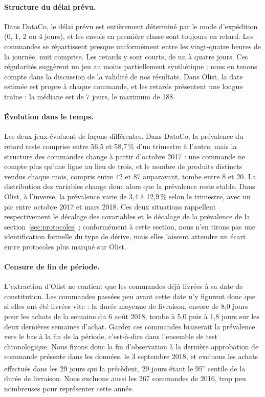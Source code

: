 \documentclass[11pt,a4paper]{article}
\theoremstyle{definition}
\begin{document}
\paragraph{Structure du délai prévu.} Dans DataCo, le délai prévu est entièrement déterminé par le mode d'expédition (0, 1, 2 ou 4 jours), et les envois en première classe sont toujours en retard. Les commandes se répartissent presque uniformément entre les vingt-quatre heures de la journée, nuit comprise. Les retards y sont courts, de un à quatre jours. Ces régularités suggèrent un jeu au moins partiellement synthétique ; nous en tenons compte dans la discussion de la validité de nos résultats. Dans Olist, la date estimée est propre à chaque commande, et les retards présentent une longue traîne : la médiane est de 7 jours, le maximum de 188.

\paragraph{Évolution dans le temps.} Les deux jeux évoluent de façons différentes. Dans DataCo, la prévalence du retard reste comprise entre 56,5 et 58,7\,\% d'un trimestre à l'autre, mais la structure des commandes change à partir d'octobre 2017 : une commande ne compte plus qu'une ligne au lieu de trois, et le nombre de produits distincts vendus chaque mois, compris entre 42 et 87 auparavant, tombe entre 8 et 20. La distribution des variables change donc alors que la prévalence reste stable. Dans Olist, à l'inverse, la prévalence varie de 3,4 à 12,9\,\% selon le trimestre, avec un pic entre octobre 2017 et mars 2018. Ces deux situations rappellent respectivement le décalage des covariables et le décalage de la prévalence de la section~\ref{sec:protocoles} ; conformément à cette section, nous n'en tirons pas une identification formelle du type de dérive, mais elles laissent attendre un écart entre protocoles plus marqué sur Olist.

\paragraph{Censure de fin de période.} L'extraction d'Olist ne contient que les commandes déjà livrées à sa date de constitution. Les commandes passées peu avant cette date n'y figurent donc que si elles ont été livrées vite : la durée moyenne de livraison, encore de 8,0 jours pour les achats de la semaine du 6 août 2018, tombe à 5,0 puis à 1,8 jours sur les deux dernières semaines d'achat. Garder ces commandes biaiserait la prévalence vers le bas à la fin de la période, c'est-à-dire dans l'ensemble de test chronologique. Nous fixons donc la fin d'observation à la dernière approbation de commande présente dans les données, le 3 septembre 2018, et excluons les achats effectués dans les 29 jours qui la précèdent, 29 jours étant le 95\textsuperscript{e} centile de la durée de livraison. Nous excluons aussi les 267 commandes de 2016, trop peu nombreuses pour représenter cette année.
\end{document}
